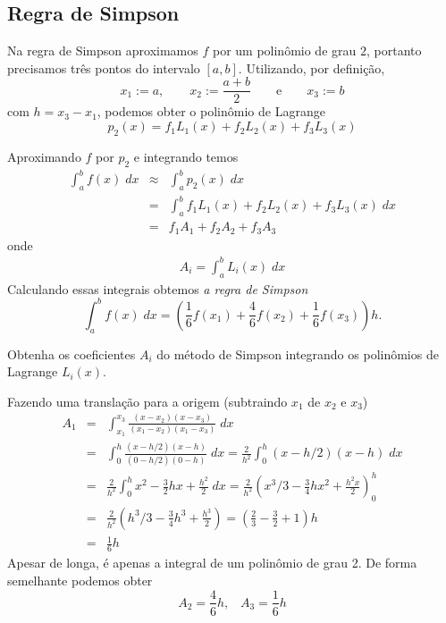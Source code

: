 \subsection{Regra de Simpson}
Na regra de Simpson aproximamos $f$ por um polinômio de grau $2$, portanto precisamos três pontos do intervalo $[a,b]$. Utilizando, por definição,
$$
x_1:=a,\qquad x_2:=\frac{a+b}{2}\qquad \text{e}\qquad x_3:=b
$$
com $h=x_3-x_1$, podemos obter o polinômio de Lagrange 
\begin{equation*}
    p_2(x) = f_1L_1(x) + f_2L_2(x)  + f_3L_3(x)
\end{equation*}

Aproximando $f$ por $p_2$ e integrando temos
\begin{eqnarray}
\int_a^bf(x)\;dx &\approx&\int_a^b p_2(x) \;dx \\ 
               &=&\int_a^b f_1L_1(x) + f_2L_2(x)  + f_3L_3(x) \;dx \\  
               &=&f_1 A_1 + f_2A_2  + f_3A_3  
\end{eqnarray}
onde
\begin{eqnarray}
  A_i = \int_a^b L_i(x) \;dx  
\end{eqnarray}
Calculando essas integrais obtemos \emph{a regra de Simpson}
$$
\int_a^bf(x)\;dx=\left(\frac{1}{6}f(x_1)+\frac{4}{6}f(x_2)+\frac{1}{6}f(x_3)\right)h.
$$

\begin{ex}
Obtenha os coeficientes $A_i$ do método de Simpson  integrando os polinômios de Lagrange $L_i(x)$.

Fazendo uma translação para a origem (subtraindo $x_1$ de $x_2$ e $x_3$)
\begin{eqnarray*}
   A_1 &=& \int_{x_1}^{x_3} \frac{(x-x_2)(x-x_3)}{(x_1-x_2)(x_1-x_3)}\;dx \\
       &=& \int_0^h \frac{(x-h/2)(x-h)}{(0-h/2)(0-h)}\;dx 
        =  \frac{2}{h^2} \int_0^h (x-h/2)(x-h)\;dx \\
       &=& \frac{2}{h^2} \int_0^h x^2 -\frac{3}{2}hx+\frac{h^2}{2}\;dx 
        =  \frac{2}{h^2} (x^3/3 -\frac{3}{4}hx^2+\frac{h^2x}{2})_0^h \\  
       &=& \frac{2}{h^2} (h^3/3 -\frac{3}{4}h^3+\frac{h^3}{2})   
        =  (\frac{2}{3}-\frac{3}{2}+1)h\\
       &=& \frac{1}{6}h
\end{eqnarray*}
Apesar de longa, é apenas a integral de um polinômio de grau 2. De forma semelhante podemos obter
$$
A_2 = \frac{4}{6}h, \;\;\; A_3 = \frac{1}{6}h
$$
\end{ex}



